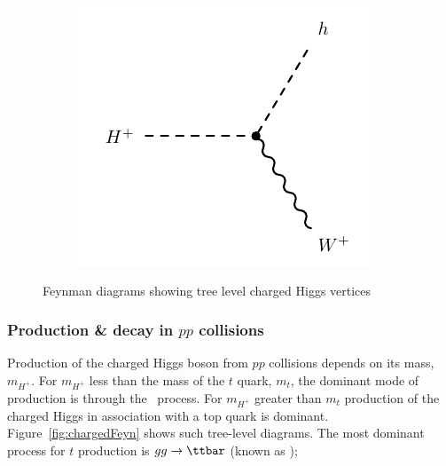 \begin{figure}[!h]
\begin{subfigure}{0.33\textwidth}
   \includegraphics[width=\textwidth]{figures/chargedHh.pdf}
\end{subfigure}%
\caption{Feynman diagrams showing tree level charged Higgs vertices}
\label{fig:chargedHverts}
\end{figure}

\subsubsection{Production \& decay in $pp$ collisions}
\par Production of the charged Higgs boson from $pp$ collisions depends on its mass, $m_{H^{+}}$.
For $m_{H^{+}}$ less than the mass of the $t$ quark, $m_t$, the dominant mode of production is 
through the \tHb\ process.  For $m_{H^{+}}$ greater than $m_t$ production of the charged Higgs 
in association with a top quark is dominant. Figure~\ref{fig:chargedFeyn} shows such tree-level 
diagrams. The most dominant process for $t$ production is $gg\rightarrow\ttbar$ (known as \ttbar);


